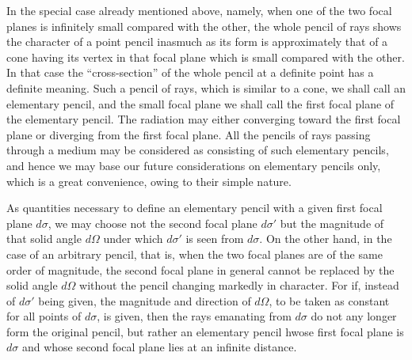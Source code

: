 \documentclass[12pt,oneside]{book}
\begin{document}
In the special case already mentioned above, namely, when one of the two focal planes is infinitely small compared with the other, the whole pencil of rays shows the character of a point pencil inasmuch as its form is approximately that of a cone having its vertex in that focal plane which is small compared with the other. In that case the ``cross-section'' of the whole pencil at a definite point has a definite meaning. Such a pencil of rays, which is similar to a cone, we shall call an elementary pencil, and the small focal plane we shall call the first focal plane of the elementary pencil. The radiation may either converging toward the first focal plane or diverging from the first focal plane. All the pencils of rays passing through a medium may be considered as consisting of such elementary pencils, and hence we may base our future considerations on elementary pencils only, which is a great convenience, owing to their simple nature. \par 

As quantities necessary to define an elementary pencil with a given first focal plane $d\sigma$, we may choose not the second focal plane $d\sigma'$ but the magnitude of that solid angle $d\Omega$ under which $d\sigma'$ is seen from $d\sigma$. On the other hand, in the case of an arbitrary pencil, that is, when the two focal planes are of the same order of magnitude, the second focal plane in general cannot be replaced by the solid angle $d\Omega$ without the pencil changing markedly in character. For if, instead of $d\sigma'$ being given, the magnitude and direction of $d\Omega$, to be taken as constant for all points of $d\sigma$, is given, then the rays emanating from $d\sigma$ do not any longer form the original pencil, but rather an elementary pencil hwose first focal plane is $d\sigma$ and whose second focal plane lies at an infinite distance. \par 
\end{document}
